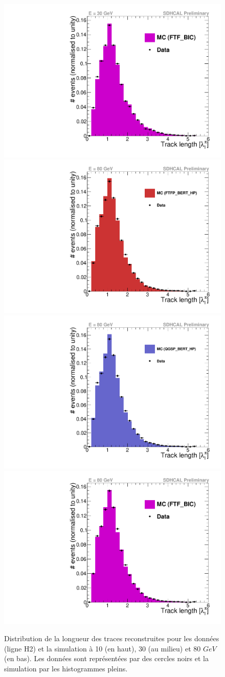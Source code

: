 \begin{figure}[!ht]
  \includegraphics[width=.32\textwidth]{Shower/figs/tracklength_pi-_30GeV_ftf_bic.pdf}\\
  \includegraphics[width=.32\textwidth]{Shower/figs/tracklength_pi-_80GeV_ftfp_bert_hp.pdf}
  \includegraphics[width=.32\textwidth]{Shower/figs/tracklength_pi-_80GeV_qgsp_bert_hp.pdf}
  \includegraphics[width=.32\textwidth]{Shower/figs/tracklength_pi-_80GeV_ftf_bic.pdf}
  \caption{Distribution de la longueur des traces reconstruites pour les données (ligne H2) et la simulation à 10 (en haut), 30 (au milieu) et 80 $GeV$ (en bas). Les données sont représentées par des cercles noirs et la simulation par les histogrammes pleins. \label{fig.pi-_tracklength}}
\end{figure}
